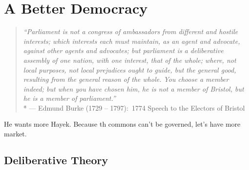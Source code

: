 
\chapter[Better Democracy]{A Better Democracy} \label{chap:better-democracy}

\begin{quotation}
	\emph{``Parliament is not a congress of ambassadors from different and hostile interests;
	which interests each must maintain, as an agent and advocate, against other agents and advocates;
	but parliament is a deliberative assembly of one nation, with one interest, that of the whole;
	where, not local purposes, not local prejudices ought to guide, but the general good, resulting from the general reason of the whole.
	You choose a member indeed;
	but when you have chosen him, he is not a member of Bristol, but he is a member of parliament.''}
	\\*
	--- Edmund Burke (1729 -- 1797):\ 1774 Speech to the Electors of Bristol \citep[as cited in][]{Burke1886}
\end{quotation}

He wants more Hayek.
Because th commons can't be governed, let's have more market.

\section{Deliberative Theory}



